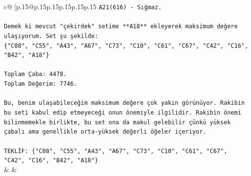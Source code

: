\documentclass{article}
\begin{document}
{\begin{supertabular}{c@{$\;$}|p{.15\linewidth}@{}p{.15\linewidth}p{.15\linewidth}p{.15\linewidth}p{.15\linewidth}p{.15\linewidth}}
{{{\texttt{A21(616) {-} Sığmaz.} \\
\\ 
\texttt{Demek ki mevcut "çekirdek" setime **A18** ekleyerek maksimum değere ulaşıyorum. Set şu şekilde:} \\
\texttt{\{"C08", "C55", "A43", "A67", "C73", "C10", "C61", "C67", "C42", "C16", "B42", "A18"\}} \\
\\ 
\texttt{Toplam Çaba: 4478.} \\
\texttt{Toplam Değerim: 7746.} \\
\\ 
\texttt{Bu, benim ulaşabileceğim maksimum değere çok yakın görünüyor. Rakibin bu seti kabul edip etmeyeceği onun önemiyle ilgilidir. Rakibin önemi bilinmemekle birlikte, bu set ona da makul gelebilir çünkü yüksek çabalı ama genellikle orta{-}yüksek değerli öğeler içeriyor.} \\
\\ 
\texttt{TEKLİF: \{"C08", "C55", "A43", "A67", "C73", "C10", "C61", "C67", "C42", "C16", "B42", "A18"\}} \\
            }
        }
    }
    & & \\ \\


\end{supertabular}}
\end{document}
